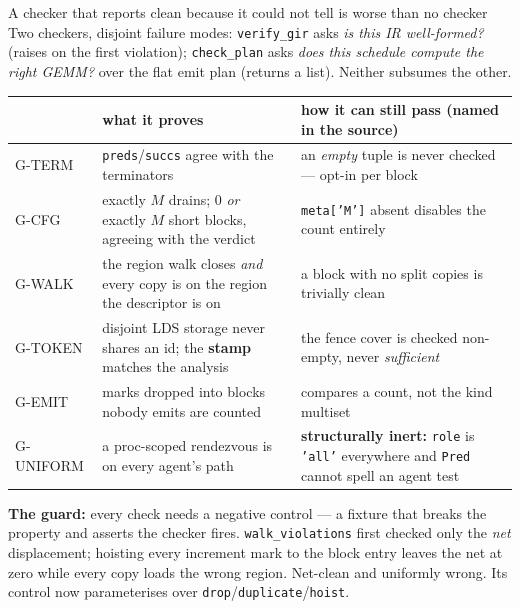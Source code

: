 \documentclass[aspectratio=169,9pt]{beamer}
\newcommand{\key}[1]{\textcolor{acc}{\textbf{#1}}}
\newcommand{\bad}[1]{\textcolor{warn}{\textbf{#1}}}
\newcommand{\good}[1]{\textcolor{ok}{\textbf{#1}}}
\begin{document}
\begin{frame}{A checker that reports clean because it could not tell is worse than no checker}
\scriptsize
Two checkers, disjoint failure modes: \texttt{verify\_gir} asks \emph{is this IR well-formed?} (raises
on the first violation); \texttt{check\_plan} asks \emph{does this schedule compute the right GEMM?}
over the flat emit plan (returns a list). Neither subsumes the other.

\vspace{2pt}
\begin{tabular}{@{}l p{4.9cm} p{5.1cm}@{}}
\toprule
& \textbf{what it proves} & \textbf{how it can still pass} \bad{(named in the source)} \\
\midrule
G-TERM   & \texttt{preds}/\texttt{succs} agree with the terminators & an \emph{empty} tuple is never checked --- opt-in per block \\
G-CFG    & exactly $M$ drains; 0 \emph{or} exactly $M$ short blocks, agreeing with the verdict & \texttt{meta['M']} absent disables the count entirely \\
G-WALK   & the region walk closes \emph{and} every copy is on the region the descriptor is on & a block with no split copies is trivially clean \\
G-TOKEN  & disjoint LDS storage never shares an id; the \key{stamp} matches the analysis & the fence cover is checked non-empty, never \emph{sufficient} \\
G-EMIT   & marks dropped into blocks nobody emits are counted & compares a count, not the kind multiset \\
G-UNIFORM & a proc-scoped rendezvous is on every agent's path & \bad{structurally inert:} \texttt{role} is \texttt{'all'} everywhere and \texttt{Pred} cannot spell an agent test \\
\bottomrule
\end{tabular}

\vspace{3pt}
\good{The guard:} every check needs a negative control --- a fixture that breaks the property and
asserts the checker fires. \texttt{walk\_violations} first checked only the \emph{net} displacement;
hoisting every increment mark to the block entry leaves the net at zero while every copy loads the
wrong region. Net-clean and uniformly wrong. Its control now parameterises over
\texttt{drop}/\texttt{duplicate}/\texttt{hoist}.
\end{frame}
\end{document}
